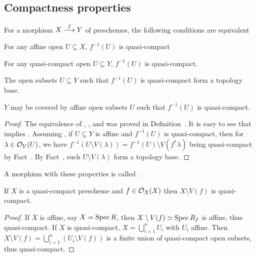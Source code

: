 \documentclass[a4paper,parskip=half,numbers=enddot, DIV=12]{scrreprt}
\begin{document}
\subsection{Compactness properties}
\begin{fact}
    For a morphism $X\morphism[f] Y$ of preschemes, the following conditions are equivalent
    \begin{alphanumerate}
    \item 
        For any affine open $U\subseteq X$, $f^{-1}(U)$ is quasi-compact
    \item 
        For any quasi-compact open $U\subseteq Y$, $f^{-1}(U)$ is quasi-compact.
    \item 
        The open subsets $U\subseteq Y$ such that $f^{-1}(U)$ is quasi-compact form a topology base.
    \item 
        $Y$ may be covered by affine open subsets $U$ such that $f^{-1}(U)$ is quasi-compact.
    \end{alphanumerate}
\end{fact}
\begin{proof}
	The equivalence of , , and  was proved in Definition~. It is easy to see that  implies . Assuming , if $U\subseteq Y$ is affine and $f^{-1}(U)$ is quasi-compact, then for $\lambda\in \mathcal{O}_Y(U)$, we have $f^{-1}(U\setminus V(\lambda)) = f^{-1}(U) \setminus  V(f^*\lambda)$ being quasi-compact by Fact~. By Fact~, such $U\setminus V(\lambda)$ form a topology base.
\end{proof}
\begin{defi} 
    A morphism with these properties is called .
\end{defi}
\begin{fact}
    If $X$ is a quasi-compact prescheme and $f\in \mathcal{O}_X(X)$ then $X\setminus V(f)$ is quasi-compact.
\end{fact}
\begin{proof}
    If $X$ is affine, say $X=\operatorname{Spec} R$, then $X\setminus V(f) \simeq \operatorname{Spec} R_f$ is affine, thus quasi-compact. If $X$ is quasi-compact, $X=\bigcup_{i=1}^n U_i$ with $U_i$ affine. Then $X\setminus V(f) = \bigcup_{i=1}^n(U_i\setminus V(f))$ is a finite union of quasi-compact open subsets, thus quasi-compact.
\end{proof}
\end{document}
